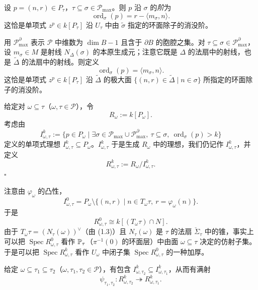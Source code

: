 \begin{definition}
设 $p=(n,r)\in P_\tau$，$\tau\subseteq\sigma\in\mathcal{P}_{\max}$。则 $p$ 沿 $\sigma$ 的\emph{阶}为
\[
  \operatorname{ord}_\sigma(p)=r-\langle m_\sigma,n\rangle.
\]
这恰是单项式 $z^p\in k[P_\tau]$ 沿 $U_\tau$ 中由 $\tilde\sigma$ 指定的环面除子的消没阶。

用 $\mathcal{P}^{\partial}_{\max}$ 表示 $\mathcal{P}$ 中维数为 $\dim B-1$ 且含于 $\partial B$ 的胞腔之集。对 $\tau\subseteq\sigma\in\mathcal{P}^{\partial}_{\max}$，设 $m_\sigma\in M$ 是射线 $N_{\Delta}(\sigma)$ 的本原生成元；注意它既是 $\Delta$ 的法扇中的射线，也是 $\tilde\Delta$ 的法扇中的射线。则定义
\[
  \operatorname{ord}_\sigma(p)=\langle m_\sigma,n\rangle.
\]
这恰是单项式 $z^p\in k[P_\tau]$ 沿 $\tilde\Delta$ 的极大面 $\{(n,r)\in\tilde\Delta\mid n\in\sigma\}$ 所指定的环面除子的消没阶。

给定对 $\omega\subseteq\tau$（$\omega,\tau\in\mathcal{P}$），令
\[
  R_\omega:=k[P_\omega].
\]
考虑由
\[
  I^k_{\omega,\tau}:=\{p\in P_\omega\mid\exists\sigma\in\mathcal{P}_{\max}\cup\mathcal{P}^{\partial}_{\max},\ \tau\subseteq\sigma,\ \operatorname{ord}_\sigma(p)>k\}
\]
定义的单项式理想 $I^k_{\omega,\tau}\subseteq P_\omega$。$I^k_{\omega,\tau}$ 于是生成 $R_\omega$ 中的理想，我们仍记作 $I^k_{\omega,\tau}$，并定义
\[
  R^k_{\omega,\tau}:=R_\omega/I^k_{\omega,\tau}.
\]
\hfill$\square$
\end{definition}


注意由 $\varphi_\omega$ 的凸性，
\[
  I^0_{\omega,\tau}=P_\omega\setminus\{(n,r)\mid n\in T_\omega\tau,\ r=\varphi_\omega(n)\}.
\]
于是
\[
  R^0_{\omega,\tau}\cong k[(T_\omega\tau)\cap N].
\]
由于 $T_\omega\tau=(N_\tau(\omega))^{\vee}$（由 (1.3)）且 $N_\tau(\omega)$ 是 $\tau$ 的法扇 $\check\Sigma_\tau$ 中的锥，事实上可以把 $\operatorname{Spec} R^0_{\omega,\tau}$ 看作 $\mathbb{P}_\tau$（$\pi^{-1}(0)$ 的环面层）中由面 $\omega\subseteq\tau$ 决定的仿射子集。于是可以把 $\operatorname{Spec} R^k_{\omega,\tau}$ 看作 $U_\omega$ 中闭子集 $\operatorname{Spec} R^0_{\omega,\tau}$ 的一种加厚。

给定 $\omega\subseteq\tau_1\subseteq\tau_2$（$\omega,\tau_1,\tau_2\in\mathcal{P}$），有包含 $I^k_{\omega,\tau_2}\subseteq I^k_{\omega,\tau_1}$，从而有满射
\[
  \psi_{\tau_1,\tau_2}:R^k_{\omega,\tau_2}\twoheadrightarrow R^k_{\omega,\tau_1}.
\]


